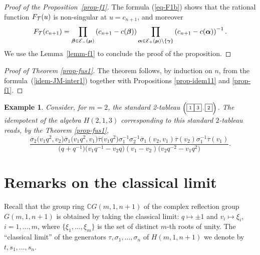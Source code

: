 \documentclass[pdftex]{sigma}
\newcommand{\bsi}{{\overline{\sigma}}}
\newcommand{\bta}{{\overline{\tau}}}
\newcommand{\mum}{\boldsymbol{\mu}}
\newcommand{\alm}{\boldsymbol{\alpha}}
\newcommand{\bem}{\boldsymbol{\beta}}
\newcommand{\gam}{\boldsymbol{\gamma}}
\newtheorem*{Example}{Example}
\begin{document}
\begin{proof}[Proof of the Proposition~\ref{prop-f1}] The formula (\ref{eq-F1b}) shows that the rational function $F_{{\cal{T}}}(u)$ is non-singular at $u=c_{n+1}$, and moreover
\begin{gather*}
F_{{\cal{T}}}(c_{n+1})= \prod_{\bem\in {\cal{E}}_-(\mum)}\left(c_{n+1}-c(\bem)\right)\prod_{\alm\in {\cal{E}}_+(\mum)\backslash\{\gam\}}\left(c_{n+1}-c(\alm)\right)^{-1} .
\end{gather*}
We use the Lemma~\ref{lemm-f1} to conclude the proof of the proposition.
\end{proof}


\begin{proof}[Proof of Theorem  \ref{prop-fus1}]
 The theorem follows, by induction on $n$, from the formula~(\ref{idem-JM-inter1}) together with Propositions \ref{prop-idem11} and \ref{prop-f1}.
\end{proof}


\begin{Example}
Consider, for $m=2$, the standard 2-tableau ${\textrm{\tiny{$\left(
\fbox{\scriptsize{$1$}}\fbox{\scriptsize{$3$}}\, ,\fbox{\scriptsize{$2$}}\right)$}}}$. The idempotent of the algebra $H(2,1,3)$ corresponding to this standard $2$-tableau reads, by the Theorem \ref{prop-fus1},
\[
\frac{\bsi_2\big(v_1q^2,v_2\big) \bsi_1\big(v_1q^2,v_1\big) \bta\big(v_1q^2\big) \sigma_1^{-1} \sigma_2^{-1} \bsi_1(v_2,v_1) \bta(v_2)
\sigma_1^{-1} \bta(v_1)}{\big(q+q^{-1}\big)\big(v_1q^{-1}-v_2q\big)(v_1-v_2)\big(v_2q^{-2}-v_1q^2\big)}  .
\]
\end{Example}

\section{Remarks on the classical limit}\label{sec-cla-lim}

Recall that the group ring $\mathbb{C}G(m,1,n+1)$ of the complex ref\/lection group $G(m,1,n+1)$ is obtained by taking the classical limit: $q\mapsto\pm1$ and $v_i\mapsto\xi_i$, $i=1,\dots,m$, where $\{\xi_1,\dots,\xi_m\}$ is the set of distinct $m$-th roots of unity.
The ``classical limit'' of the generators $\tau, \sigma_1, \dots, \sigma_{n}$ of $H(m,1,n+1)$ we denote by $t, s_1,\dots, s_{n}$.
\end{document}
